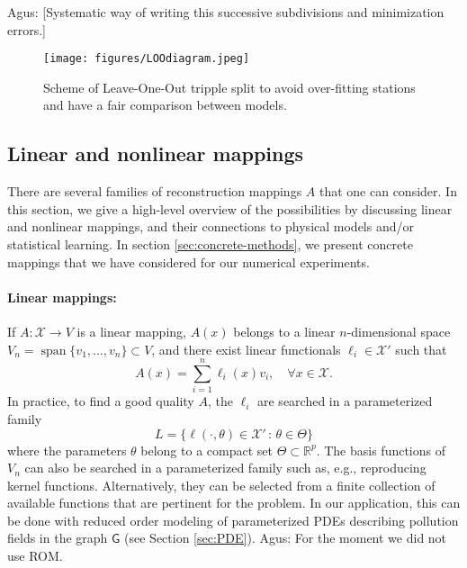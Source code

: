 \documentclass[11pt,a4paper,twoside]{article}
\theoremstyle{definition}
\numberwithin{equation}{section}
\newcommand{\cX}{\ensuremath{\mathcal{X}}}
\newcommand{\bR}{\ensuremath{\mathbb{R}}}
\newcommand{\G}{\ensuremath{\textsf{G}}} %
\newcommand{\<}{\langle}
\renewcommand{\>}{\rangle}
\newcommand{\vspan}{\operatorname{span}}
\newcommand{\cond}{\ensuremath{\,:\,}}
\newcommand{\ascomment}[1]{{\color{teal} Agus: #1}}
\begin{document}
\ascomment{[Systematic way of writing this successive subdivisions and minimization errors.]}



\begin{figure}
    \centering
    \texttt{[image: figures/LOOdiagram.jpeg]}
    \caption{Scheme of Leave-One-Out tripple split to avoid over-fitting stations and have a fair comparison between models.}
    \label{fig:loodiagram}
\end{figure}

\subsection{Linear and nonlinear mappings}
\label{sec:mappings}
There are several families of reconstruction mappings $A$ that one can consider. In this section, we give a high-level overview of the possibilities by discussing  linear and nonlinear mappings, and their connections to physical models and/or statistical learning. In section \ref{sec:concrete-methods}, we present concrete mappings that we have considered for our numerical experiments.

\paragraph{Linear mappings:} If $A: \cX\to V$ is a linear mapping, $A(x)$ belongs to a linear $n$-dimensional space $V_n = \vspan\{v_1,\dots, v_n\} \subset V$, and there exist linear functionals $\ell_i \in \cX'$ such that
$$
A(x) = \sum_{i=1}^n \ell_i(x) v_i, \quad \forall x \in \cX.
$$
In practice, to find a good quality $A$, the $\ell_i$ are searched in a parameterized family
$$
L = \{\ell(\cdot , \theta) \in \cX' \cond \theta \in \Theta\}
$$
where the parameters $\theta$ belong to a compact set $\Theta \subset \bR^p$. The basis functions of $V_n$ can also be searched in a parameterized family such as, e.g., reproducing kernel functions. Alternatively, they can be selected from a finite collection of available functions that are pertinent for the problem. In our application, this can be done with reduced order modeling of parameterized PDEs describing pollution fields in the graph $\G$ (see Section \ref{sec:PDE}). \ascomment{For the moment we did not use ROM.}
\end{document}
